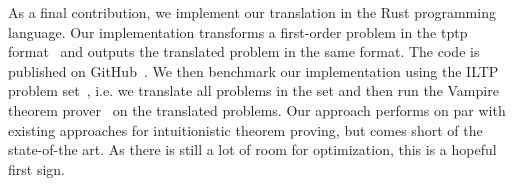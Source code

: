 \documentclass{article}
\begin{document}
	
	As a final contribution, we implement our translation in the Rust programming language. Our implementation transforms a first-order problem in the tptp format~\cite{tptp} and outputs the translated problem in the same format. The code is published on GitHub~\cite{implementation}. We then benchmark our implementation using the ILTP problem set~\cite{iltp}, i.e. we translate all problems in the set and then run the Vampire theorem prover~\cite{Kov_cs_2013} on the translated problems. Our approach performs on par with existing approaches for intuitionistic theorem proving, but comes short of the state-of-the art. As there is still a lot of room for optimization, this is a hopeful first sign.
	
	\begingroup
	
	
	\endgroup
\end{document}
